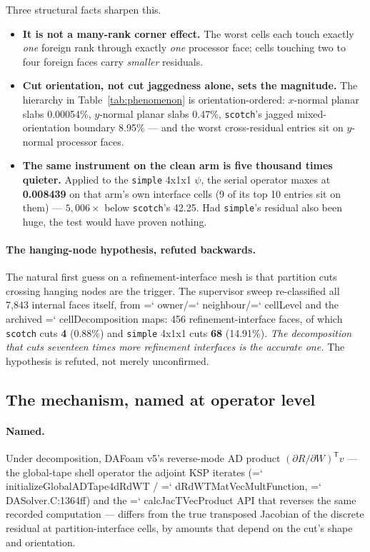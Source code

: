 \documentclass[11pt,a4paper]{article}
\newcommand{\artifact}[1]{{\small\ttfamily\hyphenchar\font=`\-\relax
  \def\_{\textunderscore\allowbreak}#1}}
\begin{document}
Three structural facts sharpen this.

\begin{itemize}
\item \textbf{It is not a many-rank corner effect.} The worst cells each touch exactly
\emph{one} foreign rank through exactly \emph{one} processor face; cells touching two to four
foreign faces carry \emph{smaller} residuals.
\item \textbf{Cut orientation, not cut jaggedness alone, sets the magnitude.} The hierarchy
in Table~\ref{tab:phenomenon} is orientation-ordered: \(x\)-normal planar slabs 0.00054\%,
\(y\)-normal planar slabs 0.47\%, \texttt{scotch}'s jagged mixed-orientation boundary 8.95\%
--- and the worst cross-residual entries sit on \(y\)-normal processor faces.
\item \textbf{The same instrument on the clean arm is five thousand times quieter.} Applied
to the \texttt{simple} 4x1x1 \(\psi\), the serial operator maxes at \textbf{0.008439} on that
arm's own interface cells (9 of its top 10 entries sit on them) --- \(5{,}006\times\) below
\texttt{scotch}'s 42.25. Had \texttt{simple}'s residual also been huge, the test would have
proven nothing.
\end{itemize}

\paragraph{The hanging-node hypothesis, refuted backwards.} The natural first guess on a
refinement-interface mesh is that partition cuts crossing hanging nodes are the trigger. The
supervisor sweep re-classified all 7{,}843 internal faces itself, from
\artifact{owner}/\artifact{neighbour}/\artifact{cellLevel} and the archived
\artifact{cellDecomposition} maps: 456 refinement-interface faces, of which \texttt{scotch}
cuts \textbf{4} (0.88\%) and \texttt{simple} 4x1x1 cuts \textbf{68} (14.91\%).
\emph{The decomposition that cuts seventeen times more refinement interfaces is the accurate
one.} The hypothesis is refuted, not merely unconfirmed.

\subsection{The mechanism, named at operator level}
\label{sec:mechop}

\paragraph{Named.} Under decomposition, DAFoam v5's reverse-mode AD product
\((\partial R/\partial W)^{\mathsf T} v\) --- the global-tape shell operator the adjoint KSP
iterates (\artifact{initializeGlobalADTape4dRdWT} / \artifact{dRdWTMatVecMultFunction},
\artifact{DASolver.C:1364ff}) and the \artifact{calcJacTVecProduct} API that reverses the same
recorded computation --- differs from the true transposed Jacobian of the discrete residual
at partition-interface cells, by amounts that depend on the cut's shape and orientation.
\end{document}
